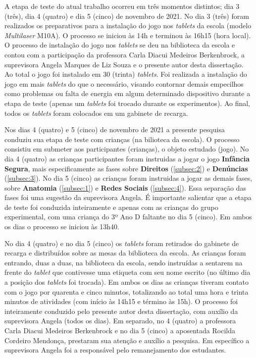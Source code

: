 A etapa de teste do atual trabalho ocorreu em três momentos distintos; dia 3 (três), dia 4 (quatro) e dia 5 (cinco) de novembro de 2021. No dia 3 (três) foram realizados os preparativos para a instalação do jogo nos \textit{tablets} da escola (modelo \textit{Multilaser} M10A). O processo se iniciou às 14h e terminou às 16h15 (hora local). O processo de instalação do jogo nos \textit{tablets} se deu na biblioteca da escola e contou com a participação da professora Carla Diacui Medeiros Berkenbrock, a suprevisora Angela Marques de Liz Souza e o presente autor desta dissertação. Ao total o jogo foi instalado em 30 (trinta) \textit{tablets}. Foi realizada a instalação do jogo em mais \textit{tablets} do que o necessário, visando contornar demais empecilhos como problemas ou falta de energia em algum determinado dispositivo durante a etapa de teste (apenas um \textit{tablets} foi trocado durante os experimentos). Ao final, todos os \textit{tablets} foram colocados em um gabinete de recarga.

Nos dias 4 (quatro) e 5 (cinco) de novembro de 2021 a presente pesquisa conduziu sua etapa de teste com crianças (na bilioteca da escola). O processo consistiu em submeter aos participantes (crianças), o objeto estudado (jogo). No dia 4 (quatro) as crianças participantes foram instruidas a jogar o jogo \textbf{Infância Segura}, mais especificamente as fases sobre \textbf{Direitos} (\autoref{subsec:2}) e \textbf{Denúncias} (\autoref{subsec:3}). No dia 5 (cinco) as crianças foram instruidas a jogar as demais fases, sobre \textbf{Anatomia} (\autoref{subsec:1}) e \textbf{Redes Sociais} (\autoref{subsec:4}). Essa separação das fases foi uma sugestão da suprevisora Angela. É importante salientar que a etapa de teste foi conduzida inteiramente e apenas com as crianças do grupo experimental, com uma criança do 3º Ano D faltante no dia 5 (cinco). Em ambos os dias o processo se iniciou às 13h40.

No dia 4 (quatro) e no dia 5 (cinco) os \textit{tablets} foram retirados do gabinete de recarga e distribuídos sobre as mesas da biblioteca da escola. As crianças foram entrando, duas a duas, na biblioteca da escola, sendo instruídas a sentarem na frente do \textit{tablet} que contivesse uma etiqueta com seu nome escrito (no último dia a posição dos \textit{tablets} foi trocada). Em ambos os dias as crianças tiveram contato com o jogo por quarenta e cinco minutos, totalizando ao total uma hora e trinta minutos de atividades (com início às 14h15 e término às 15h). O processo foi inteiramente conduzido pelo presente autor desta dissertação, com auxílio da suprevisora Angela (todos os dias). Em separado, no 4 (quatro) a professora Carla Diacui Medeiros Berkenbrock e no dia 5 (cinco) a aposentada Rocilda Cordeiro Mendonça, prestaram sua atenção e auxílio a pesquisa. Em específico a suprevisora Angela foi a responsável pelo remanejamento dos estudantes. %

